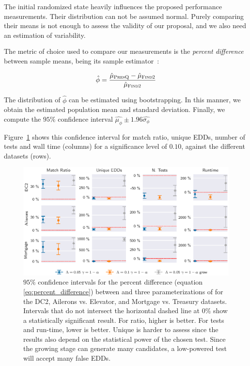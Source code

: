 The initial randomized state heavily influences the proposed performance measurements.
Their distribution can not be assumed normal.
Purely comparing their means is not enough to assess the validity of our proposal, and we also need an estimation of variability.

The metric of choice used to compare our measurements is the \emph{percent difference}
between sample means, being its sample estimator~\cite{campelo_sample_2019}:

\begin{equation}
    \label{eq:percent_difference}
    \hat{\phi} = \frac{\hat{\mu}_{\textsc{PresQ}} - \hat{\mu}_{\textsc{Find2}}}{\hat{\mu}_{\textsc{Find2}}}
\end{equation}

The distribution of
$\hat{\phi}$ can be estimated using bootstrapping.
In this manner, we obtain the estimated population mean and standard deviation. Finally,
we compute the $95\%$ confidence interval $\hat{\mu_\phi} \pm 1.96 \hat{\sigma_\phi}$

Figure~\ref{fig:results_summary} shows this confidence interval for match ratio, unique \glspl{EDD},
number of tests and wall time (columns) for a significance level of $0.10$, against the
different datasets (rows).

\begin{figure}[htbp]
    \centering
    \includegraphics[width=\linewidth]{images/5_presq/all}
    \caption[$95\%$ confidence intervals for the percent difference between \Find and \PresQ.]{
        $95\%$ confidence intervals for the percent difference
        (equation \ref{eq:percent_difference}) between \Find and
        three parameterizations of \PresQ for the DC2, Ailerons vs. Elevator, and
        Mortgage vs. Treasury datasets.
        Intervals that do not intersect the horizontal dashed line at $0\%$  show a statistically
        significant result.
        For ratio, higher is better. For tests and run-time, lower is better. Unique is harder to
        assess since the results also depend on the statistical power of the chosen test.
        Since the growing stage can generate many candidates, a low-powered test will accept
        many false \glspl{EDD}.
    }
    \label{fig:results_summary}
\end{figure}

